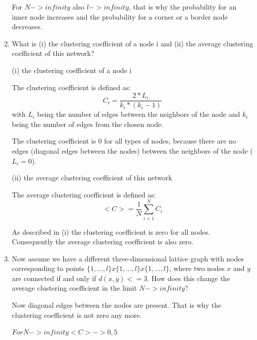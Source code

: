 \begin{enumerate}
	For $N -> infinity$ also $l -> infinity$, that is why the probability for an inner node increases and the probability for a corner or a border node decreases.
	
	\item What is (i) the clustering coefficient of a node i and (ii) the average clustering coefficient of this network?
	
	(i) the clustering coefficient of a node i
	
	The clustering coefficient is defined as:
	\begin{equation}
	C_i = \frac{2*L_i}{k_i * (k_i-1)}
	\end{equation}
	with $L_i$ being the number of edges between the neighbors of the node and $k_i$ being the number of edges from the chosen node.
	
	The clustering coefficient is 0 for all types of nodes, because there are no edges (diagonal edges between the nodes) between the neighbors of the node ($L_i = 0$).
	
	(ii) the average clustering coefficient of this network
	
	The average clustering coefficient is defined as:
	\begin{equation}
	<C> = \frac{1}{N} \sum_{i=1}^{N} C_i
	\end{equation}
	
	As described in (i) the clustering coefficient is zero for all nodes. Consequently the average clustering coefficient is also zero.
	
	\item Now assume we have a different three-dimensional lattice graph with nodes corresponding to points $\{1,...,l\}x\{1,...,l\}x\{1,...,l\}$, where two nodes $x$ and $y$ are connected if and only if $d(x,y) <= 3$. How	does this change the average clustering coefficient in the limit $N -> infinity$?
	
	Now diagonal edges between the nodes are present. That is why the clustering coefficient is not zero any more.
	
	$ For N -> infinity <C> -> 0,5 $
	
\end{enumerate}